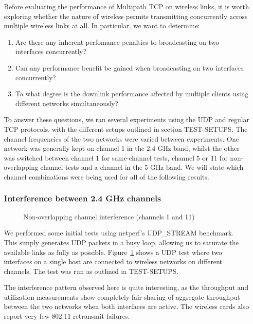 Before evaluating the performance of Multipath TCP on wireless links, it is
worth exploring whether the nature of wireless permits transmitting concurrently
across multiple wireless links at all. In particular, we want to determine:

\begin{enumerate}
  \item Are there any inherent perfomance penalties to broadcasting on two
    interfaces concurrently?
  \item Can any performance benefit be gained when broadcasting on two
    interfaces concurrently?
  \item To what degree is the downlink performance affected by multiple clients
    using different networks simultaneously?
\end{enumerate}

To answer these questions, we ran several experiments using the UDP and regular
TCP protocols, with the different setups outlined in section TEST-SETUPS.      %
The channel frequencies of the two networks were varied between experiments. One
network was generally kept on channel 1 in the 2.4 GHz band, whilst the other
was switched between channel 1 for same-channel tests, channel 5 or 11 for
non-overlapping channel tests and a channel in the 5 GHz band. We will state
which channel combinations were being used for all of the following results.

\subsubsection{Interference between 2.4 GHz channels}

\begin{figure}[h]
 \centering
 
 \caption{Non-overlapping channel interference (channels 1 and 11)}\label{graph:cc-interference}
\end{figure}

We performed some initial tests using netperf's UDP\_STREAM benchmark. This
simply generates UDP packets in a busy loop, allowing us to saturate the
available links as fully as possible. Figure~\ref{graph:cc-interference} shows a
UDP test where two interfaces on a single host are connected to wireless
networks on different channels. The test was run as outlined in TEST-SETUPS.

The interference pattern observed here is quite interesting, as the throughput
and utilization measurements show completely fair sharing of aggregate
throughput between the two networks when both interfaces are active. The
wireless cards also report very few 802.11 retransmit failures.

